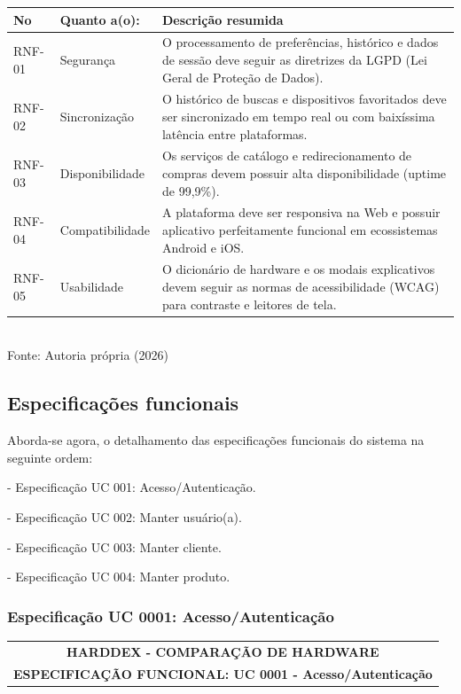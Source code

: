 \begin{quadro}[!htbp]
\centering
\caption{Requisitos não funcionais}
	\begin{tabular}{ | m{1.7cm} | m{4cm}| m{9cm} | }
		\hline
		\cellcolor{gray!20}\textbf{No} & \cellcolor{gray!20}\textbf{Quanto a(o):} & \cellcolor{gray!20}\textbf{Descrição resumida} \\ \hline
        RNF-01 & Segurança & O processamento de preferências, histórico e dados de sessão deve seguir as diretrizes da LGPD (Lei Geral de Proteção de Dados).\\ \hline
        RNF-02 & Sincronização & O histórico de buscas e dispositivos favoritados deve ser sincronizado em tempo real ou com baixíssima latência entre plataformas.\\ \hline
        RNF-03 & Disponibilidade & Os serviços de catálogo e redirecionamento de compras devem possuir alta disponibilidade (uptime de 99,9\%).\\ \hline
        RNF-04 & Compatibilidade & A plataforma deve ser responsiva na Web e possuir aplicativo perfeitamente funcional em ecossistemas Android e iOS.\\ \hline
        RNF-05 & Usabilidade & O dicionário de hardware e os modais explicativos devem seguir as normas de acessibilidade (WCAG) para contraste e leitores de tela.\\ \hline
	\end{tabular}
	\\ \vspace{0.2cm}
	Fonte: Autoria própria (2026)
	\label{tab:reqnaofunc1}
\end{quadro}

\newpage
\subsection {Especificações funcionais}

Aborda-se agora, o detalhamento das especificações funcionais do sistema na seguinte ordem:

- Especificação UC 001: Acesso/Autenticação.

- Especificação UC 002: Manter usuário(a).

- Especificação UC 003: Manter cliente.

- Especificação UC 004: Manter produto. \\


\newpage
\subsubsection {Especificação UC 0001: Acesso/Autenticação}
\begin{center}
    \begin{tabular}{  | c |  }
        \hline
            \textbf {HARDDEX - COMPARAÇÃO DE HARDWARE}\\ 
            \textbf {ESPECIFICAÇÃO FUNCIONAL: UC 0001 - Acesso/Autenticação}\\ 
        \hline
    \end{tabular}
\end{center}

